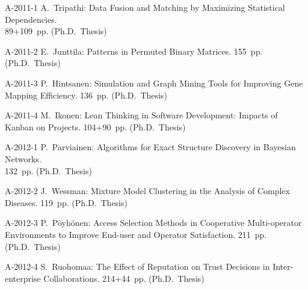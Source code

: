 \documentclass[11pt,twoside,onecolumn,final,notitlepage]{article}
\def\aloitus{\topsep0pt\partopsep0pt\itemsep0pt\parsep\parskip
\rightmargin0pt\listparindent0pt\itemindent0pt
\leftmargin14mm\labelsep1mm\labelwidth13mm
\def\makelabel##1{##1\hfill}}
\begin{document}
\begin{list}{}{\aloitus}
\item[A-2011-1] A.~Tripathi: Data Fusion and Matching by Maximizing Statistical Dependencies.\\89+109~pp. (Ph.D.\ Thesis) 
\item[A-2011-2] E.~Junttila: Patterns in Permuted Binary Matrices. 155~pp. (Ph.D.\ Thesis) 
\item[A-2011-3] P.~Hintsanen: Simulation and Graph Mining Tools for Improving Gene Mapping Efficiency. 136~pp. (Ph.D.\ Thesis) 
\item[A-2011-4] M.~Ikonen: Lean Thinking in Software Development: Impacts of Kanban on Projects. 104+90~pp. (Ph.D.\ Thesis) 
\item[A-2012-1] P.~Parviainen: Algorithms for Exact Structure Discovery in Bayesian Networks.\\132~pp. (Ph.D.\ Thesis)
\item[A-2012-2] J.~Wessman: Mixture Model Clustering in the Analysis of Complex Diseases. 119~pp. (Ph.D.\ Thesis)
\item[A-2012-3] P.~P{\"o}yh{\"o}nen: Access Selection Methods in Cooperative Multi-operator Environments to Improve End-user and Operator Satisfaction. 211~pp. (Ph.D.\ Thesis)
\item[A-2012-4] S.~Ruohomaa: The Effect of Reputation on Trust Decisions in Inter-enterprise Collaborations. 214+44~pp. (Ph.D.\ Thesis)
\end{list}
\end{document}
